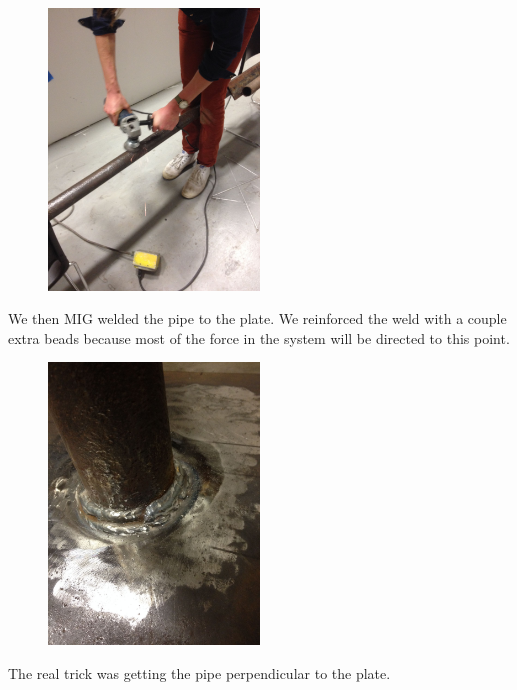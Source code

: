 \documentclass[11pt]{article} %
\begin{document}
\begin{figure}
  \centering
  \caption{   }
  \includegraphics[width=0.50\textwidth]{roofmount/03.jpeg}
\end{figure}


We then MIG welded the pipe to the plate. We reinforced the weld with a couple extra beads because most of the force in the system will be directed to this point.

\begin{figure}
  \centering
  \caption{   }
  \includegraphics[width=0.50\textwidth]{roofmount/04.jpeg}
\end{figure}


The real trick was getting the pipe perpendicular to the plate.
\end{document}
